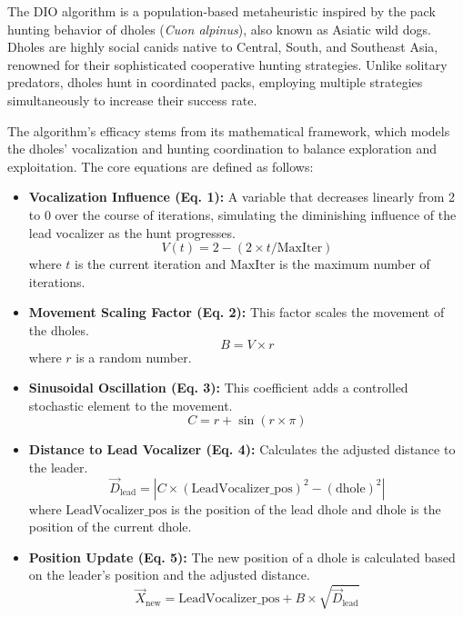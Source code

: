 \documentclass[12pt, a4paper]{article}
\begin{document}
The DIO algorithm is a population-based metaheuristic inspired by the pack hunting behavior of dholes (\textit{Cuon alpinus}), also known as Asiatic wild dogs. Dholes are highly social canids native to Central, South, and Southeast Asia, renowned for their sophisticated cooperative hunting strategies. Unlike solitary predators, dholes hunt in coordinated packs, employing multiple strategies simultaneously to increase their success rate.

The algorithm's efficacy stems from its mathematical framework, which models the dholes' vocalization and hunting coordination to balance exploration and exploitation. The core equations are defined as follows:

\begin{itemize}
    \item \textbf{Vocalization Influence (Eq. 1):} A variable that decreases linearly from 2 to 0 over the course of iterations, simulating the diminishing influence of the lead vocalizer as the hunt progresses.
    \begin{equation}
        V(t) = 2 - (2 \times t / \text{MaxIter})
    \end{equation}
    where $t$ is the current iteration and $\text{MaxIter}$ is the maximum number of iterations.

    \item \textbf{Movement Scaling Factor (Eq. 2):} This factor scales the movement of the dholes.
    \begin{equation}
        B = V \times r
    \end{equation}
    where $r$ is a random number.

    \item \textbf{Sinusoidal Oscillation (Eq. 3):} This coefficient adds a controlled stochastic element to the movement.
    \begin{equation}
        C = r + \sin(r \times \pi)
    \end{equation}

    \item \textbf{Distance to Lead Vocalizer (Eq. 4):} Calculates the adjusted distance to the leader.
    \begin{equation}
        \vec{D}_{\text{lead}} = |C \times (\text{LeadVocalizer\_pos})^2 - (\text{dhole})^2|
    \end{equation}
    where $\text{LeadVocalizer\_pos}$ is the position of the lead dhole and $\text{dhole}$ is the position of the current dhole.

    \item \textbf{Position Update (Eq. 5):} The new position of a dhole is calculated based on the leader's position and the adjusted distance.
    \begin{equation}
        \vec{X}_{\text{new}} = \text{LeadVocalizer\_pos} + B \times \sqrt{\vec{D}_{\text{lead}}}
    \end{equation}
    

\end{itemize}
\end{document}
